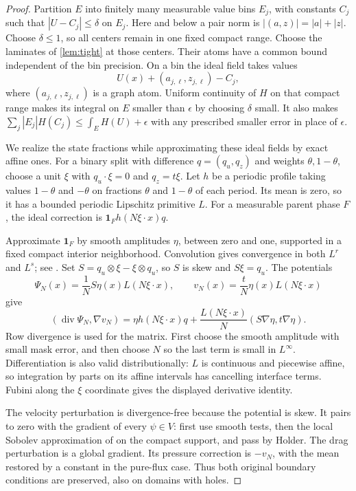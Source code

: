 \documentclass[11pt]{article}
\theoremstyle{remark}
\newcommand{\Div}{\operatorname{div}}
\newcommand{\ind}{\mathbf 1}
\begin{document}
\begin{proof}
Partition $E$ into finitely many measurable value bins $E_j$, with
constants $C_j$ such that $|U-C_j|\le\delta$ on $E_j$.
Here and below a pair norm is $|(a,z)|=|a|+|z|$.
Choose $\delta\le1$, so all centers remain in one fixed compact
range. Choose the laminates of \cref{lem:tight} at those centers.
Their atoms have a common bound independent of the bin precision.
On a bin the ideal field takes values
\[
 U(x)+(a_{j,\ell},z_{j,\ell})-C_j,
\]
where $(a_{j,\ell},z_{j,\ell})$ is a graph atom. Uniform continuity
of $H$ on that compact range makes its integral on $E$ smaller
than $\epsilon$ by choosing $\delta$ small. It also makes
$\sum_j|E_j|H(C_j)\le\int_E H(U)+\epsilon$ with any prescribed
smaller error in place of $\epsilon$.

We realize the state fractions while approximating these ideal fields
by exact affine ones. For a binary split with difference
$q=(q_u,q_z)$ and weights $\theta,1-\theta$, choose a unit
$\xi$ with $q_u\cdot\xi=0$ and $q_z=t\xi$.
Let $h$ be a periodic profile taking values $1-\theta$ and
$-\theta$ on fractions $\theta$ and $1-\theta$ of each period.
Its mean is zero, so it has a bounded periodic Lipschitz primitive $L$.
For a measurable parent phase $F$, the ideal correction is
$\ind_F h(N\xi\cdot x)q$.

Approximate $\ind_F$ by smooth amplitudes $\eta$, between zero
and one, supported in a fixed compact interior neighborhood. Convolution
gives convergence in both $L^r$ and $L^s$; see
\cite[Theorem 4.22]{Brezis}. Set
$S=q_u\otimes\xi-\xi\otimes q_u$, so $S$ is skew and $S\xi=q_u$.
The potentials
\begin{equation}\label{eq:potentials}
 \Psi_N(x)=\frac1N S\eta(x)L(N\xi\cdot x),\qquad
 v_N(x)=\frac tN\eta(x)L(N\xi\cdot x)
\end{equation}
give
\[
 (\Div\Psi_N,\nabla v_N)
 =\eta h(N\xi\cdot x)q
 +\frac{L(N\xi\cdot x)}N(S\nabla\eta,t\nabla\eta).
\]
Row divergence is used for the matrix. First choose the smooth amplitude
with small mask error, and then choose $N$ so the last term is small
in $L^\infty$. Differentiation is also valid distributionally: $L$ is
continuous and piecewise affine, so integration by parts on its affine
intervals has cancelling interface terms. Fubini along the $\xi$
coordinate gives the displayed derivative identity.

The velocity perturbation is divergence-free because the potential is
skew. It pairs to zero with the gradient of every $\psi\in V$:
first use smooth tests, then the local Sobolev approximation of
\cite[Theorem 9.2]{Brezis} on the compact support, and pass by Holder.
The drag perturbation is a global gradient. Its pressure correction is
$-v_N$, with the mean restored by a constant in the pure-flux case.
Thus both original boundary conditions are preserved, also on domains
with holes.


\end{proof}
\end{document}
